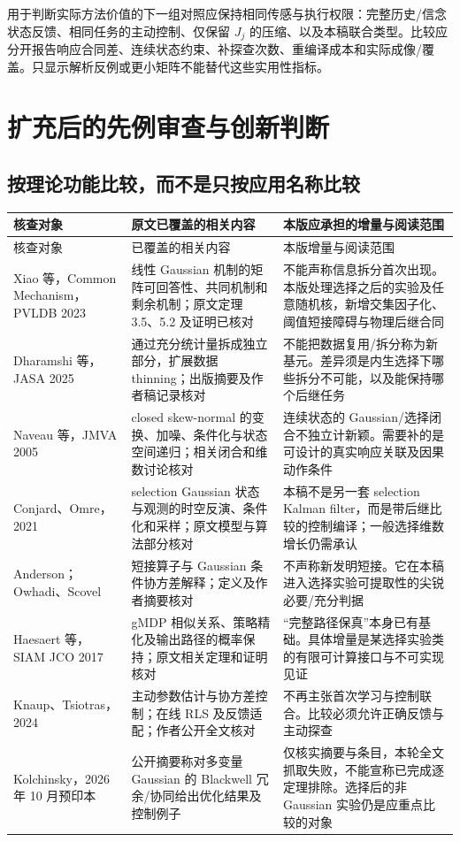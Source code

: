 \documentclass[UTF8,fontset=fandol,11pt,a4paper]{ctexart}
\theoremstyle{definition}\newtheorem{definition}[theorem]{定义}\newtheorem{assumption}[theorem]{条件}
\numberwithin{equation}{section}
\begin{document}
用于判断实际方法价值的下一组对照应保持相同传感与执行权限：完整历史/信念状态反馈、相同任务的主动控制、仅保留 $J_j$ 的压缩、以及本稿联合类型。比较应分开报告响应合同差、连续状态约束、补探查次数、重编译成本和实际成像/覆盖。只显示解析反例或更小矩阵不能替代这些实用性指标。

\section{扩充后的先例审查与创新判断}
\label{sec:novelty}
\subsection{按理论功能比较，而不是只按应用名称比较}
\begin{longtable}{p{.25\linewidth}p{.33\linewidth}p{.34\linewidth}}
\toprule
核查对象 & 原文已覆盖的相关内容 & 本版应承担的增量与阅读范围\\\midrule
\endfirsthead
\toprule 核查对象 & 已覆盖的相关内容 & 本版增量与阅读范围\\\midrule
\endhead
\bottomrule\endfoot
Xiao 等，Common Mechanism，PVLDB 2023\cite{xiao}
& 线性 Gaussian 机制的矩阵可回答性、共同机制和剩余机制；原文定理 3.5、5.2 及证明已核对
& 不能声称信息拆分首次出现。本版处理选择之后的实验及任意随机核，新增交集因子化、阈值短接障碍与物理后继合同\\
Dharamshi 等，JASA 2025\cite{thinning}
& 通过充分统计量拆成独立部分，扩展数据 thinning；出版摘要及作者稿记录核对
& 不能把数据复用/拆分称为新基元。差异须是内生选择下哪些拆分不可能，以及能保持哪个后继任务\\
Naveau 等，JMVA 2005\cite{naveau}
& closed skew-normal 的变换、加噪、条件化与状态空间递归；相关闭合和维数讨论核对
& 连续状态的 Gaussian/选择闭合不独立计新颖。需要补的是可设计的真实响应关联及因果动作条件\\
Conjard、Omre，2021\cite{selectionkalman}
& selection Gaussian 状态与观测的时空反演、条件化和采样；原文模型与算法部分核对
& 本稿不是另一套 selection Kalman filter，而是带后继比较的控制编译；一般选择维数增长仍需承认\\
Anderson；Owhadi、Scovel\cite{anderson,owhadi}
& 短接算子与 Gaussian 条件协方差解释；定义及作者摘要核对
& 不声称新发明短接。它在本稿进入选择实验可提取性的尖锐必要/充分判据\\
Haesaert 等，SIAM JCO 2017\cite{hsa}
& gMDP 相似关系、策略精化及输出路径的概率保持；原文相关定理和证明核对
& “完整路径保真”本身已有基础。具体增量是某选择实验类的有限可计算接口与不可实现见证\\
Knaup、Tsiotras，2024\cite{dual}
& 主动参数估计与协方差控制；在线 RLS 及反馈适配；作者公开全文核对
& 不再主张首次学习与控制联合。比较必须允许正确反馈与主动探查\\
Kolchinsky，2026 年 10 月预印本\cite{kolchinsky}
& 公开摘要称对多变量 Gaussian 的 Blackwell 冗余/协同给出优化结果及控制例子
& 仅核实摘要与条目，本轮全文抓取失败，不能宣称已完成逐定理排除。选择后的非 Gaussian 实验仍是应重点比较的对象\\
\end{longtable}
\end{document}
